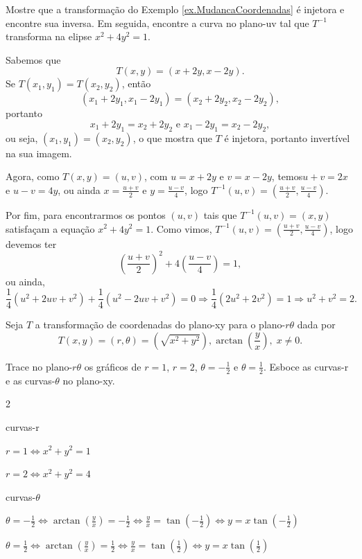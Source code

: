 \begin{example}
    Mostre que a transformação do Exemplo \eqref{ex.MudancaCoordenadas} é injetora e encontre sua inversa. Em seguida, encontre a curva no plano-uv tal que \(T^{-1}\) transforma na elipse \(x^2 + 4y^2 = 1\).

    Sabemos que \[T(x,y) = (x+2y,x-2y).\] Se \(T(x_1,y_1) = T(x_2,y_2)\), então \[(x_1 + 2y_1,x_1-2y_1) = (x_2 + 2y_2,x_2-2y_2),\] portanto \[x_1 + 2y_1 = x_2 + 2y_2 \text{ e } x_1 - 2y_1 = x_2 - 2y_2,\] ou seja, \((x_1,y_1) = (x_2,y_2)\), o que mostra que \(T\) é injetora, portanto invertível na sua imagem.

    Agora, como \(T(x,y) = (u,v)\), com \(u = x+2y\) e \(v=x-2y\), temos\(u+v = 2x\) e \(u-v=4y\), ou ainda \(x = \frac{u+v}{2}\) e \(y = \frac{u-v}{4}\), logo \(T^{-1}(u,v) = \left( \frac{u+v}{2}, \frac{u-v}{4} \right)\).

    Por fim, para encontrarmos os pontos \((u,v)\) tais que \(T^{-1}(u,v) = (x,y)\) satisfaçam a equação \(x^2 + 4y^2=1\). Como vimos, \(T^{-1}(u,v) = \left( \frac{u+v}{2}, \frac{u-v}{4} \right)\), logo devemos ter \[\left( \frac{u+v}{2}\right)^2 + 4\left(\frac{u-v}{4} \right) = 1,\] ou ainda, \[\frac{1}{4} (u^2 + 2uv + v^2) + \frac{1}{4}(u^2 - 2uv + v^2) = 0 \Rightarrow \frac{1}{4}(2u^2 + 2v^2) = 1 \Rightarrow u^2 + v^2 = 2.\]
\end{example}

\begin{example}
    Seja \(T\) a transformação de coordenadas do plano-xy para o plano-\(r\theta\) dada por \[T(x,y) = (r,\theta) = (\sqrt{x^2 + y^2}),\arctan\left( \frac{y}{x} \right),\; x\neq 0.\]

    Trace no plano-\(r\theta\) os gráficos de \(r=1\), \(r=2\), \(\theta = -\frac{1}{2}\) e \(\theta = \frac{1}{2}\). Esboce as curvas-r e as curvas-\(\theta\) no plano-xy.
\end{example}

\begin{multicols}{2}
    \begin{center}
        curvas-r

        \(r=1 \Leftrightarrow x^2 + y^2 = 1\)

        \(r=2 \Leftrightarrow x^2 + y^2 = 4\)
    \end{center}
    \newcolumn
    \begin{center}
        curvas-\(\theta\)

        \(\theta = -\frac{1}{2} \Leftrightarrow \arctan\left( \frac{y}{x} \right) = -\frac{1}{2} \Leftrightarrow \frac{y}{x} = \tan\left( -\frac{1}{2} \right) \Leftrightarrow y = x \tan\left( -\frac{1}{2} \right)\)

        \(\theta = \frac{1}{2} \Leftrightarrow \arctan\left( \frac{y}{x} \right) = \frac{1}{2} \Leftrightarrow \frac{y}{x} = \tan\left( \frac{1}{2} \right) \Leftrightarrow y = x \tan\left( \frac{1}{2} \right)\)
    \end{center}
\end{multicols}

